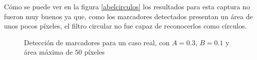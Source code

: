 Cómo se puede ver en la figura \ref{abelcirculos} los resultados para esta captura no fueron muy buenos ya que, como los marcadores detectados presentan un área de unos pocos píxeles, el filtro circular no fue capaz de reconocerlos como círculos.  

\begin{figure}[ht!]
         \hspace{-1cm}
        \hspace{1 mm}
  \caption{Detección de marcadores para un caso real, con $A=0.3$, $B=0.1$ y área máxima de $50$ píxeles}
      \label{ejemploabeldet}
\end{figure}

